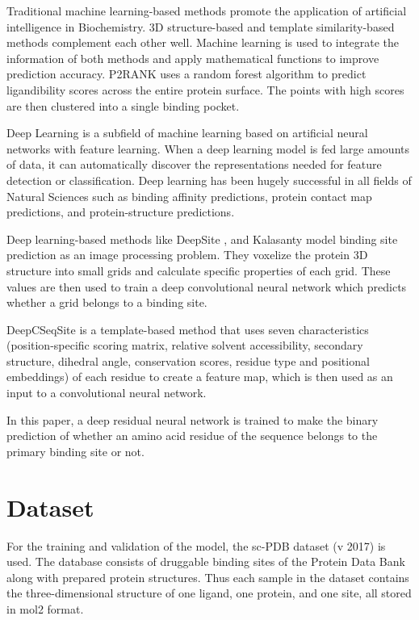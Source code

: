 \documentclass[journal=jacsat,manuscript=article]{achemso}
\begin{document}
Traditional machine learning-based methods promote the application of artificial intelligence in Biochemistry. 3D structure-based and template similarity-based methods complement each other well. Machine learning is used to integrate the information of both methods and apply mathematical functions to improve prediction accuracy. P2RANK \cite{krivak2018p2rank} uses a random forest algorithm to predict ligandibility scores across the entire protein surface. The points with high scores are then clustered into a single binding pocket.

Deep Learning is a subfield of machine learning based on artificial neural networks with feature learning. When a deep learning model is fed large amounts of data, it can automatically discover the representations needed for feature detection or classification. Deep learning has been hugely successful in all fields of Natural Sciences such as binding affinity predictions, protein contact map predictions, and protein-structure predictions.

Deep learning-based methods like DeepSite \cite{jimenez2017deepsite}, and Kalasanty \cite{stepniewska2020improving} model binding site prediction as an image processing problem. They voxelize the protein 3D structure into small grids and calculate specific properties of each grid. These values are then used to train a deep convolutional neural network which predicts whether a grid belongs to a binding site.

DeepCSeqSite \cite{cui2019predicting} is a template-based method that uses seven characteristics (position-specific scoring matrix, relative solvent accessibility, secondary structure, dihedral angle, conservation scores, residue type and positional embeddings) of each residue to create a feature map, which is then used as an input to a convolutional neural network.

In this paper, a deep residual neural network is trained to make the binary prediction of whether an amino acid residue of the sequence belongs to the primary binding site or not.

\section{Dataset}
\quad For the training and validation of the model, the sc-PDB\cite{desaphy2015sc} dataset (v 2017) is used. The database consists of druggable binding sites of the Protein Data Bank along with prepared protein structures. Thus each sample in the dataset contains the three-dimensional structure of one ligand, one protein, and one site, all stored in mol2 format.
\end{document}
